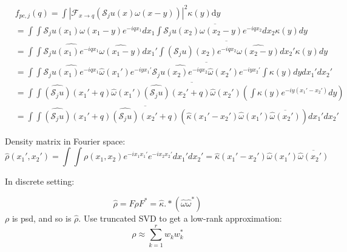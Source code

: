 \documentclass[UTF8]{beamer}
\begin{document}
\begin{frame}[c]
	
	\begin{small}
	$$
		\begin{aligned}
		&f_{p c, j}(q) = \int\left|\mathcal{F}_{x \rightarrow q}\left(\mathcal{S}_{j} u(x) \omega(x-y)\right)\right|^{2} \kappa(y) \mathrm{d} y\\
		&= \int \int \mathcal{S}_{j} u(x_1) \omega(x_1-y) e^{-iqx_1} dx_1 \overline{ \int \mathcal{S}_{j} u(x_2) \omega(x_2-y) e^{-iqx_2}dx_2 }  \kappa(y)   dy \\
		&= \int \int \widehat{\mathcal{S}_{j} u(x_1)e^{-iqx_1}} \widehat{\omega(x_1-y)}  dx_1' \overline{ \int \widehat{(\mathcal{S}_{j}u)(x_2) e^{-iqx_2} }  \widehat{\omega(x_2-y)} dx_2' } \kappa(y)   dy\\
		& = \int\int  
		\widehat{\mathcal{S}_{j} u(x_1)e^{-iqx_1}} \widehat{\omega}(x_1')e^{-iyx_1'}  \overline{ \widehat{\mathcal{S}_{j} u(x_2)e^{-iqx_2}} \widehat{\omega}(x_2')e^{-iyx_2'} }   \int   \kappa(y)   dy
		dx_1' dx_2' \\
		& =  \int\int  
		\widehat{(\mathcal{S}_{j}u)}(x_1' + q) \widehat{\omega}(x_1')   \overline{ \widehat{(\mathcal{S}_{j}u)}(x_2' + q) \widehat{\omega}(x_2') }   (\int   \kappa(y)e^{-iy(x_1'-x_2')}  dy ) \\
		& = \int\int  
		\widehat{(\mathcal{S}_{j}u)}(x_1' + q)    \overline{ \widehat{(\mathcal{S}_{j}u)}(x_2' + q)  }    (\hat{\kappa}(x_1'-x_2')\widehat{\omega}(x_1') \overline{\widehat{\omega}(x_2')}) 
		dx_1' dx_2'
		\end{aligned}
	$$	
	\end{small}
	
	
	
\end{frame}

\begin{frame}
	Density matrix in Fourier space:
	\begin{equation}
		\widehat{\rho}(x_1',x_2') = \int\int \rho(x_1,x_2) e^{-i x_1x_1'} e^{-i x_2 x_2'}dx_1'dx_2'= \hat{\kappa}(x_1'-x_2')\widehat{\omega}(x_1') \overline{\widehat{\omega}(x_2')}
	\end{equation}

	
	
	In discrete setting:
	
	\begin{equation}
		\hat{\rho} = F \rho F^* = \hat{\kappa} .* (\hat{\omega} \hat{\omega}^*)
	\end{equation}
$\rho$ is psd, and so is $\hat{\rho}$. Use truncated SVD to get a low-rank approximation:
$$
\rho \approx \sum_{k=1}^{r} w_k w_k^* 
$$
\end{frame}
\end{document}

